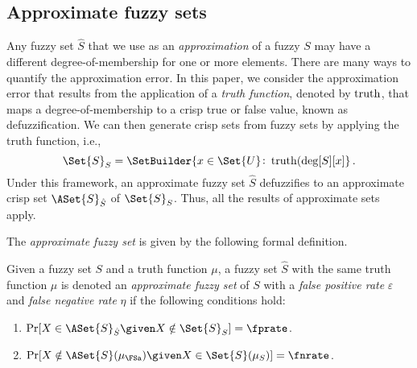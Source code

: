 \documentclass[ ../main.tex]{subfiles}
\begin{document}
\subsection{Approximate fuzzy sets}
Any fuzzy set $\hat S$ that we use as an \emph{approximation} of a fuzzy $S$ may have a different degree-of-membership for one or more elements. There are many ways to quantify the approximation error. In this paper, we consider the approximation error that results from the application of a \emph{truth function}, denoted by $\operatorname{truth}$, that maps a degree-of-membership to a crisp true or false value, known as defuzzification. We can then generate crisp sets from fuzzy sets by applying the truth function, i.e.,
\begin{equation}
    \Set{S}_{S} = \SetBuilder{x \in \Set{U} \colon \Truth(\FuzzyDeg[S][x]}\,.
\end{equation}
Under this framework, an approximate fuzzy set $\hat S$ defuzzifies to an approximate crisp set $\ASet{S}_{\hat S}$ of $\Set{S}_{S}$. Thus, all the results of approximate sets\cite{} apply. 

The \emph{approximate fuzzy set} is given by the following formal definition.
\begin{definition}
Given a fuzzy set $S$ and a truth function $\mu$, a fuzzy set $\hat S$ with the same truth function $\mu$ is denoted an \emph{approximate fuzzy set} of $S$ with a \emph{false positive rate} $\varepsilon$ and \emph{false negative rate} $\eta$ if the following conditions hold:
\begin{enumerate}
    \item $\Pr[X \in \ASet{S}_{\hat S} \given X \notin \Set{S}_{S}] = \fprate$.
    \item $\Pr[X \notin \ASet{S}(\mu_{\FSa}) \given X \in \Set{S}(\mu_{S})] = \fnrate$.    
\end{enumerate}
\end{definition}
\end{document}
